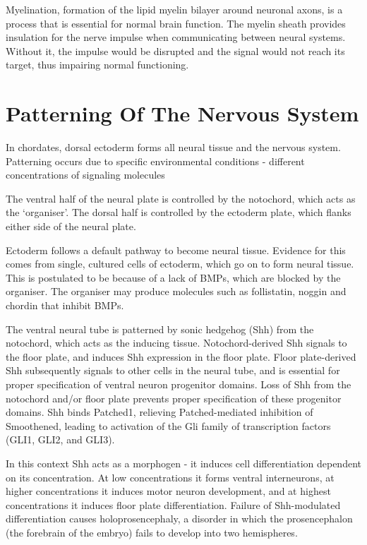 \documentclass[]{book}
\begin{document}
Myelination, formation of the lipid myelin bilayer around neuronal axons, is a process that is essential for normal brain function. The myelin sheath provides insulation for the nerve impulse when communicating between neural systems. Without it, the impulse would be disrupted and the signal would not reach its target, thus impairing normal functioning.

\hypertarget{patterning-of-the-nervous-system}{%
\section{Patterning Of The Nervous System}\label{patterning-of-the-nervous-system}}

In chordates, dorsal ectoderm forms all neural tissue and the nervous system. Patterning occurs due to specific environmental conditions - different concentrations of signaling molecules

The ventral half of the neural plate is controlled by the notochord, which acts as the `organiser'. The dorsal half is controlled by the ectoderm plate, which flanks either side of the neural plate.

Ectoderm follows a default pathway to become neural tissue. Evidence for this comes from single, cultured cells of ectoderm, which go on to form neural tissue. This is postulated to be because of a lack of BMPs, which are blocked by the organiser. The organiser may produce molecules such as follistatin, noggin and chordin that inhibit BMPs.

The ventral neural tube is patterned by sonic hedgehog (Shh) from the notochord, which acts as the inducing tissue. Notochord-derived Shh signals to the floor plate, and induces Shh expression in the floor plate. Floor plate-derived Shh subsequently signals to other cells in the neural tube, and is essential for proper specification of ventral neuron progenitor domains. Loss of Shh from the notochord and/or floor plate prevents proper specification of these progenitor domains. Shh binds Patched1, relieving Patched-mediated inhibition of Smoothened, leading to activation of the Gli family of transcription factors (GLI1, GLI2, and GLI3).

In this context Shh acts as a morphogen - it induces cell differentiation dependent on its concentration. At low concentrations it forms ventral interneurons, at higher concentrations it induces motor neuron development, and at highest concentrations it induces floor plate differentiation. Failure of Shh-modulated differentiation causes holoprosencephaly, a disorder in which the prosencephalon (the forebrain of the embryo) fails to develop into two hemispheres.
\end{document}
